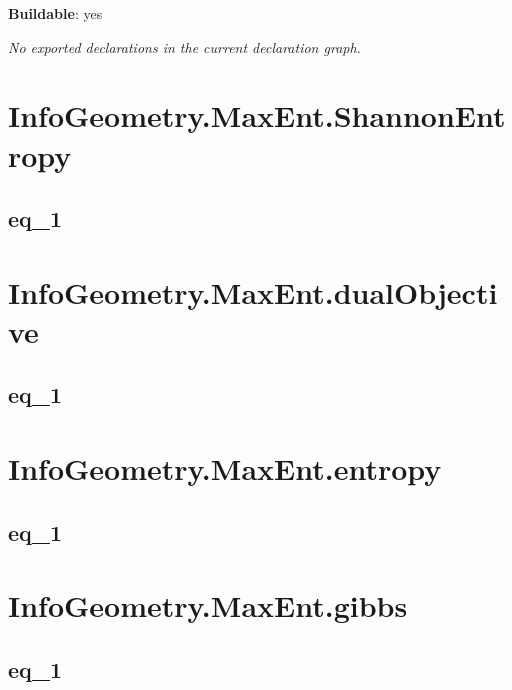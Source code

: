 \noindent\textbf{Buildable}: yes

\noindent\emph{No exported declarations in the current declaration graph.}

\section{InfoGeometry.MaxEnt.ShannonEntropy}

\subsection*{eq_1}

\begin{theorem}[blueprint="infogeometry:maxent:shannonentropy:eq_1"]
\end{theorem}

\section{InfoGeometry.MaxEnt.dualObjective}

\subsection*{eq_1}

\begin{theorem}[blueprint="infogeometry:maxent:dualobjective:eq_1"]
\end{theorem}

\section{InfoGeometry.MaxEnt.entropy}

\subsection*{eq_1}

\begin{theorem}[blueprint="infogeometry:maxent:entropy:eq_1"]
\end{theorem}

\section{InfoGeometry.MaxEnt.gibbs}

\subsection*{eq_1}

